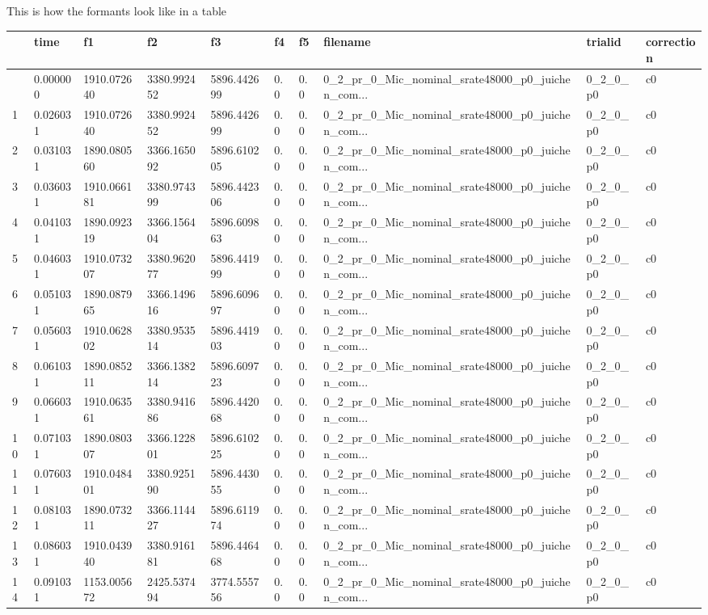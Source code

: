 \documentclass[
  letterpaper,
  DIV=11,
  numbers=noendperiod]{scrreprt}
\begin{document}
This is how the formants look like in a table

\begin{longtable}[]{@{}llllllllll@{}}
\toprule\noalign{}
& time & f1 & f2 & f3 & f4 & f5 & filename & trialid & correction \\
\midrule\noalign{}
\endhead
\bottomrule\noalign{}
\endlastfoot
0 & 0.000000 & 1910.072640 & 3380.992452 & 5896.442699 & 0.0 & 0.0 &
0\_2\_pr\_0\_Mic\_nominal\_srate48000\_p0\_juichen\_com... & 0\_2\_0\_p0
& c0 \\
1 & 0.026031 & 1910.072640 & 3380.992452 & 5896.442699 & 0.0 & 0.0 &
0\_2\_pr\_0\_Mic\_nominal\_srate48000\_p0\_juichen\_com... & 0\_2\_0\_p0
& c0 \\
2 & 0.031031 & 1890.080560 & 3366.165092 & 5896.610205 & 0.0 & 0.0 &
0\_2\_pr\_0\_Mic\_nominal\_srate48000\_p0\_juichen\_com... & 0\_2\_0\_p0
& c0 \\
3 & 0.036031 & 1910.066181 & 3380.974399 & 5896.442306 & 0.0 & 0.0 &
0\_2\_pr\_0\_Mic\_nominal\_srate48000\_p0\_juichen\_com... & 0\_2\_0\_p0
& c0 \\
4 & 0.041031 & 1890.092319 & 3366.156404 & 5896.609863 & 0.0 & 0.0 &
0\_2\_pr\_0\_Mic\_nominal\_srate48000\_p0\_juichen\_com... & 0\_2\_0\_p0
& c0 \\
5 & 0.046031 & 1910.073207 & 3380.962077 & 5896.441999 & 0.0 & 0.0 &
0\_2\_pr\_0\_Mic\_nominal\_srate48000\_p0\_juichen\_com... & 0\_2\_0\_p0
& c0 \\
6 & 0.051031 & 1890.087965 & 3366.149616 & 5896.609697 & 0.0 & 0.0 &
0\_2\_pr\_0\_Mic\_nominal\_srate48000\_p0\_juichen\_com... & 0\_2\_0\_p0
& c0 \\
7 & 0.056031 & 1910.062802 & 3380.953514 & 5896.441903 & 0.0 & 0.0 &
0\_2\_pr\_0\_Mic\_nominal\_srate48000\_p0\_juichen\_com... & 0\_2\_0\_p0
& c0 \\
8 & 0.061031 & 1890.085211 & 3366.138214 & 5896.609723 & 0.0 & 0.0 &
0\_2\_pr\_0\_Mic\_nominal\_srate48000\_p0\_juichen\_com... & 0\_2\_0\_p0
& c0 \\
9 & 0.066031 & 1910.063561 & 3380.941686 & 5896.442068 & 0.0 & 0.0 &
0\_2\_pr\_0\_Mic\_nominal\_srate48000\_p0\_juichen\_com... & 0\_2\_0\_p0
& c0 \\
10 & 0.071031 & 1890.080307 & 3366.122801 & 5896.610225 & 0.0 & 0.0 &
0\_2\_pr\_0\_Mic\_nominal\_srate48000\_p0\_juichen\_com... & 0\_2\_0\_p0
& c0 \\
11 & 0.076031 & 1910.048401 & 3380.925190 & 5896.443055 & 0.0 & 0.0 &
0\_2\_pr\_0\_Mic\_nominal\_srate48000\_p0\_juichen\_com... & 0\_2\_0\_p0
& c0 \\
12 & 0.081031 & 1890.073211 & 3366.114427 & 5896.611974 & 0.0 & 0.0 &
0\_2\_pr\_0\_Mic\_nominal\_srate48000\_p0\_juichen\_com... & 0\_2\_0\_p0
& c0 \\
13 & 0.086031 & 1910.043940 & 3380.916181 & 5896.446468 & 0.0 & 0.0 &
0\_2\_pr\_0\_Mic\_nominal\_srate48000\_p0\_juichen\_com... & 0\_2\_0\_p0
& c0 \\
14 & 0.091031 & 1153.005672 & 2425.537494 & 3774.555756 & 0.0 & 0.0 &
0\_2\_pr\_0\_Mic\_nominal\_srate48000\_p0\_juichen\_com... & 0\_2\_0\_p0
& c0 \\
\end{longtable}
\end{document}
